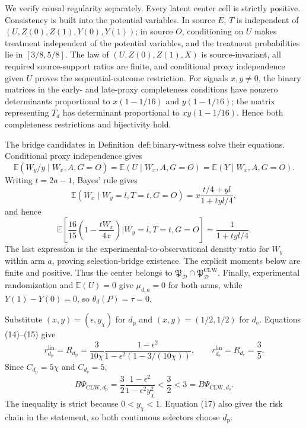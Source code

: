We verify causal regularity separately.  Every latent center cell is strictly positive.  Consistency is built into the potential variables.  In source \(E\), \(T\) is independent of \((U,Z(0),Z(1),Y(0),Y(1))\); in source \(O\), conditioning on \(U\) makes treatment independent of the potential variables, and the treatment probabilities lie in \([3/8,5/8]\).  The law of \((U,Z(0),Z(1),X)\) is source-invariant, all required source-support ratios are finite, and conditional proxy independence given \(U\) proves the sequential-outcome restriction.  For signals \(x,y\ne0\), the binary matrices in the early- and late-proxy completeness conditions have nonzero determinants proportional to \(x(1-1/16)\) and \(y(1-1/16)\); the matrix representing \(T_d\) has determinant proportional to \(xy(1-1/16)\).  Hence both completeness restrictions and bijectivity hold.

The bridge candidates in Definition~\(\mathrm{def{:}binary\text{-}witness}\) solve their equations.  Conditional proxy independence gives
\[
 \mathbb E(W_y/y\mid W_x,A,G=O)
 =\mathbb E(U\mid W_x,A,G=O)=\mathbb E(Y\mid W_x,A,G=O).
\]
Writing \(t=2a-1\), Bayes' rule gives
\[
 \mathbb E(W_x\mid W_y=l,T=t,G=O)
 =x\frac{t/4+yl}{1+tyl/4},
\]
and hence
\[
 \mathbb E\!\left[
 \frac{16}{15}\left(1-\frac{tW_x}{4x}\right)
 \mathrel{\Big|}W_y=l,T=t,G=O\right]
 =\frac1{1+tyl/4}.                                        \tag{16}
\]
The last expression is the experimental-to-observational density ratio for \(W_y\) within arm \(a\), proving selection-bridge existence.  The explicit moments below are finite and positive.  Thus the center belongs to \(\mathfrak P_{\mathcal D}\cap\mathfrak P_{\mathcal D}^{\mathrm{CLW}}\).  Finally, experimental randomization and \(\mathbb E(U)=0\) give \(\mu_{d,a}=0\) for both arms, while \(Y(1)-Y(0)=0\), so \(\theta_d(P)=\tau=0\).

Substitute \((x,y)=(\epsilon,y_\chi)\) for \(d_{\mathrm p}\) and \((x,y)=(1/2,1/2)\) for \(d_{\mathrm e}\).  Equations (14)--(15) give
\[
 r_{d_{\mathrm p}}^{\mathrm{lin}}=R_{d_{\mathrm p}}
 =\frac{3}{10\chi}
 \frac{1-\epsilon^2}{1-\epsilon^2(1-3/(10\chi))},
 \qquad
 r_{d_{\mathrm e}}^{\mathrm{lin}}=R_{d_{\mathrm e}}=\frac35. \tag{17}
\]
Since \(C_{d_{\mathrm p}}=5\chi\) and \(C_{d_{\mathrm e}}=5\),
\[
 B\Psi_{\mathrm{CLW},d_{\mathrm p}}
 =\frac32\frac{1-\epsilon^2}{1-\epsilon^2y_\chi^2}
 <\frac32<3=B\Psi_{\mathrm{CLW},d_{\mathrm e}}.           \tag{18}
\]
The inequality is strict because \(0<y_\chi<1\).  Equation (17) also gives the risk chain in the statement, so both continuous selectors choose \(d_{\mathrm p}\).

